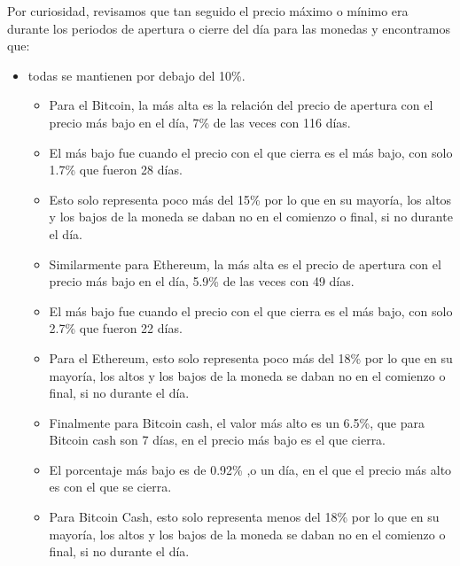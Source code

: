 \documentclass[12pt,letterpaper]{article}
\begin{document}
    Por curiosidad, revisamos que tan seguido el precio máximo o mínimo era durante los periodos de apertura o cierre del día para las monedas y encontramos que:
    \begin{itemize}

        \item  todas se mantienen por debajo del 10\%.

        \begin{itemize}

            \item Para el Bitcoin, la más alta es la relaci\'on del precio de apertura con el precio más bajo en el día, 7\% de las veces con 116 días.
            
            \item El más bajo fue cuando el precio con el que cierra es el más bajo, con solo 1.7\% que fueron 28 días.

            \item Esto solo representa poco más del 15\% por lo que en su mayoría, los altos y los bajos de la moneda se daban no en el comienzo o final, si no durante el día.

        \end{itemize}

        \begin{itemize}

            \item Similarmente para Ethereum, la más alta es el precio de apertura con el precio más bajo en el día, 5.9\% de las veces con 49 días.
            
            \item El más bajo fue cuando el precio con el que cierra es el más bajo, con solo 2.7\% que fueron 22 días.

            \item Para el Ethereum, esto solo representa poco más del 18\% por lo que en su mayoría, los altos y los bajos de la moneda se daban no en el comienzo o final, si no durante el día.

        \end{itemize}

        \begin{itemize}

            \item Finalmente para Bitcoin cash, el valor más alto es un 6.5\%, que para Bitcoin cash son 7 días, en el precio más bajo es el que cierra.

            \item El porcentaje más bajo es de 0.92\% ,o un día, en el que el precio más alto es con el que se cierra.
    
            \item Para Bitcoin Cash, esto solo representa menos del 18\% por lo que en su mayoría, los altos y los bajos de la moneda se daban no en el comienzo o final, si no durante el día.
        \end{itemize}

    \end{itemize}
\end{document}
